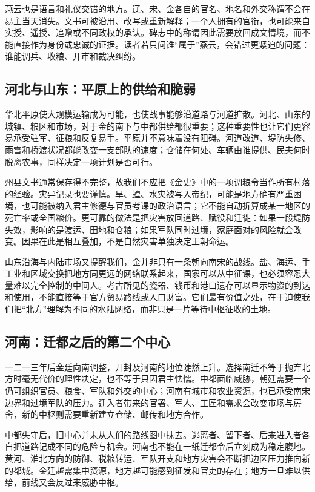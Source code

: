 燕云也是语言和礼仪交错的地方。辽、宋、金各自的官名、地名和外交称谓不会在易主当天消失。文书可被沿用、改写或重新解释；一个人拥有的官衔，也可能来自实授、遥授、追赠或不同政权的承认。碑志中的称谓因此需要放回成文情境，而不能直接作为身份或忠诚的证据。读者若只问谁“属于”燕云，会错过更紧迫的问题：谁能调兵、收粮、开市和裁决纠纷。

\subsection{河北与山东：平原上的供给和脆弱}

华北平原使大规模运输成为可能，也使战事能够沿道路与河道扩散。河北、山东的城镇、粮区和市场，对于金的南下与中都供给都很重要；这种重要性也让它们更容易承受驻军、征粮和反复易手。平原并不意味着没有阻碍。河道改道、堤防失修、雨雪和桥渡状况都能改变一支部队的速度；仓储在何处、车辆由谁提供、民夫何时脱离农事，同样决定一项计划是否可行。

州县文书通常保存得不完整，故我们不应把《金史》中的一项调粮令当作所有村落的经验。灾异记录也要谨慎。旱、蝗、水灾被写入帝纪，可能是地方确有严重困境，也可能被纳入君主修德与官员考课的政治语言；它不能自动折算成某一地区的死亡率或全国粮价。更可靠的做法是把灾害放回道路、赋役和迁徙：如果一段堤防失效，影响的是渡运、田地和仓粮；如果军队同时过境，家庭面对的风险就会改变。因果在此是相互叠加，不是自然灾害单独决定王朝命运。

山东沿海与内陆市场又提醒我们，金并非只有一条朝向南宋的战线。盐、海运、手工业和区域交换把地方同更远的网络联系起来，国家可以从中征课，也必须容忍大量难以完全控制的中间人。考古所见的瓷器、钱币和港口遗存可以显示物资的到达和使用，不能直接等于官方贸易路线或人口财富。它们最有价值之处，在于迫使我们把“北方”理解为不同的水陆网络，而非只是一片等待中枢征收的土地。

\subsection{河南：迁都之后的第二个中心}

一二一三年后金廷向南调整，开封及河南的地位陡然上升。选择南迁不等于抛弃北方时毫无代价的理性决定，也不等于只因君主怯懦。中都面临威胁，朝廷需要一个仍可组织官员、粮食、军队和外交的中心；河南有城市和农业资源，也已承受南宋边界和过境军队的压力。迁入者带来的官署、军人、工匠和需求会改变市场与房舍，新的中枢则需要重新建立仓储、邮传和地方合作。

中都失守后，旧中心并未从人们的路线图中抹去。逃离者、留下者、后来进入者各自把道路记成不同的危险与机会。河南也不能在一纸迁都令后立刻成为稳定腹地。黄河、淮北方向的防御、税粮转运、军队开支和地方灾害会不断把边区压力推向新的都城。金廷越需集中资源，地方越可能感到征发和官吏的存在；地方一旦难以供给，前线又会反过来威胁中枢。

